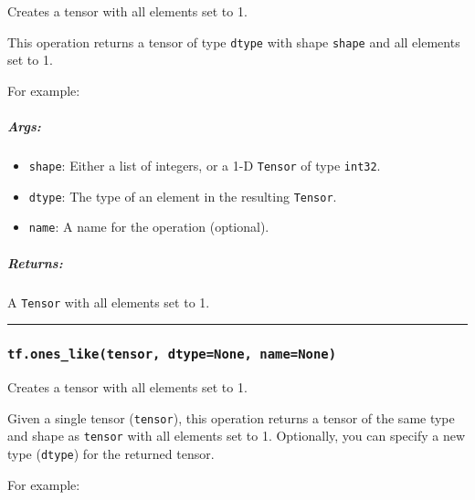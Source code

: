 Creates a tensor with all elements set to 1.

This operation returns a tensor of type \texttt{dtype} with shape
\texttt{shape} and all elements set to 1.

For example:

\begin{Shaded}
\begin{Highlighting}[]
\NormalTok{tf.ones([}\NormalTok{, }\NormalTok{], int32) }\OperatorTok{==>} \NormalTok{[[}\NormalTok{, }\NormalTok{, }\NormalTok{], [}\NormalTok{, }\NormalTok{, }\NormalTok{]]}
\end{Highlighting}
\end{Shaded}

\subparagraph{Args: }\label{args-2}

\begin{itemize}
\tightlist
\item
  \texttt{shape}: Either a list of integers, or a 1-D \texttt{Tensor} of
  type \texttt{int32}.
\item
  \texttt{dtype}: The type of an element in the resulting
  \texttt{Tensor}.
\item
  \texttt{name}: A name for the operation (optional).
\end{itemize}

\subparagraph{Returns: }\label{returns-2}

A \texttt{Tensor} with all elements set to 1.

\begin{center}\rule{0.5\linewidth}{\linethickness}\end{center}

\subsubsection{\texorpdfstring{\texttt{tf.ones\_like(tensor,\ dtype=None,\ name=None)}
}{tf.ones\_like(tensor, dtype=None, name=None) }}\label{tf.onesux5fliketensor-dtypenone-namenone}

Creates a tensor with all elements set to 1.

Given a single tensor (\texttt{tensor}), this operation returns a tensor
of the same type and shape as \texttt{tensor} with all elements set to
1. Optionally, you can specify a new type (\texttt{dtype}) for the
returned tensor.

For example:

\begin{Shaded}
\begin{Highlighting}[]
\OperatorTok{==>} \NormalTok{[[}\NormalTok{, }\NormalTok{, }\NormalTok{], [}\NormalTok{, }\NormalTok{, }\NormalTok{]]}
\end{Highlighting}
\end{Shaded}

